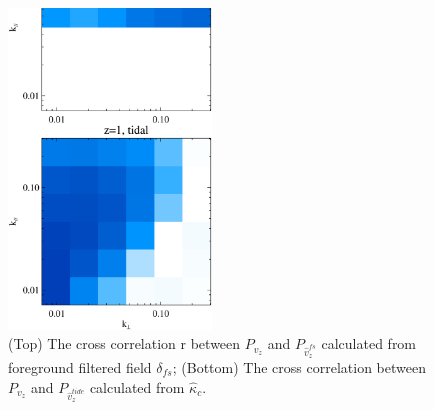 \begin{figure}[tbp]
\begin{center}
\includegraphics[width=0.48\textwidth]{compare_powv2d_z1z2.eps}
\end{center}
\vspace{-0.7cm}
\caption{(Top) The cross correlation r between $P_{v_z}$ and 
    $P_{\hat v_z^{fs}}$ calculated from foreground filtered field $\delta_{fs}$; 
    (Bottom) The cross correlation between $P_{v_z}$ and $P_{\hat v_z^{tide}}$ calculated from $\hat \kappa_c$. 
}
\label{fig:v}
\end{figure}
